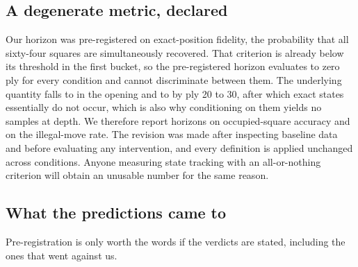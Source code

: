 \documentclass[manuscript, screen, review]{jair}
\theoremstyle{remark}
\begin{document}
\subsection{A degenerate metric, declared}
Our horizon was pre-registered on exact-position fidelity, the probability that
all sixty-four squares are simultaneously recovered. That criterion is already
below its threshold in the first bucket, so the pre-registered horizon evaluates
to zero ply for every condition and cannot discriminate between them. The
underlying quantity falls to  in the opening and to
 by ply 20 to 30, after which exact states essentially do not
occur, which is also why conditioning on them yields no samples at depth. We
therefore report horizons on occupied-square accuracy and on the illegal-move
rate. The revision was made after inspecting baseline data and before evaluating
any intervention, and every definition is applied unchanged across conditions.
Anyone measuring state tracking with an all-or-nothing criterion will obtain an
unusable number for the same reason.

\subsection{What the predictions came to}
\label{sec:verdict}

Pre-registration is only worth the words if the verdicts are stated, including
the ones that went against us.
\end{document}
